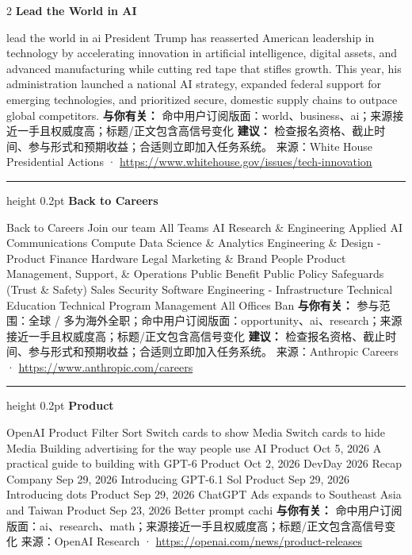 \documentclass[10.5pt]{ctexart}
\begin{document}
\begin{multicols}{2}
{\large\bfseries Lead the World in AI}\par
lead the world in ai President Trump has reasserted American leadership in technology by accelerating innovation in artificial intelligence, digital assets, and advanced manufacturing while cutting red tape that stifles growth. This year, his administration launched a national AI strategy, expanded federal support for emerging technologies, and prioritized secure, domestic supply chains to outpace global competitors.
\textbf{与你有关：} 命中用户订阅版面：world、business、ai；来源接近一手且权威度高；标题/正文包含高信号变化
\textbf{建议：} 检查报名资格、截止时间、参与形式和预期收益；合适则立即加入任务系统。
{\footnotesize\color{ormuted} 来源：White House Presidential Actions · \url{https://www.whitehouse.gov/issues/tech-innovation}}
\vspace{2mm}
\hrule height 0.2pt
\vspace{2mm}
{\large\bfseries Back to Careers}\par
Back to Careers Join our team All Teams AI Research \& Engineering Applied AI Communications Compute Data Science \& Analytics Engineering \& Design - Product Finance Hardware Legal Marketing \& Brand People Product Management, Support, \& Operations Public Benefit Public Policy Safeguards (Trust \& Safety) Sales Security Software Engineering - Infrastructure Technical Education Technical Program Management All Offices Ban
\textbf{与你有关：} 参与范围：全球 / 多为海外全职；命中用户订阅版面：opportunity、ai、research；来源接近一手且权威度高；标题/正文包含高信号变化
\textbf{建议：} 检查报名资格、截止时间、参与形式和预期收益；合适则立即加入任务系统。
{\footnotesize\color{ormuted} 来源：Anthropic Careers · \url{https://www.anthropic.com/careers}}
\vspace{2mm}
\hrule height 0.2pt
\vspace{2mm}
{\large\bfseries Product}\par
OpenAI Product Filter Sort Switch cards to show Media Switch cards to hide Media Building advertising for the way people use AI Product Oct 5, 2026 A practical guide to building with GPT-6 Product Oct 2, 2026 DevDay 2026 Recap Company Sep 29, 2026 Introducing GPT-6.1 Sol Product Sep 29, 2026 Introducing dots Product Sep 29, 2026 ChatGPT Ads expands to Southeast Asia and Taiwan Product Sep 23, 2026 Better prompt cachi
\textbf{与你有关：} 命中用户订阅版面：ai、research、math；来源接近一手且权威度高；标题/正文包含高信号变化
{\footnotesize\color{ormuted} 来源：OpenAI Research · \url{https://openai.com/news/product-releases}}

\end{multicols}
\end{document}
